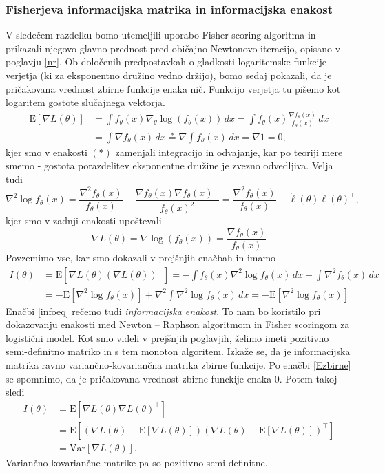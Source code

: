 \documentclass[12pt,a4paper]{amsart}
\theoremstyle{definition} %
\theoremstyle{plain} %
\begin{document}
\subsubsection{Fisherjeva informacijska matrika in informacijska enakost}
V sledečem razdelku bomo utemeljili uporabo Fisher scoring algoritma in prikazali njegovo glavno prednost pred običajno Newtonovo iteracijo, opisano v poglavju \ref{nr}.
Ob določenih predpostavkah o gladkosti logaritemske funkcije verjetja (ki za eksponentno družino vedno držijo), bomo sedaj pokazali, da je pričakovana vrednost
zbirne funkcije enaka nič. Funkcijo verjetja tu pišemo kot logaritem gostote slučajnega vektorja.
\begin{align} \label{Ezbirne}
    \mathrm{E}[\nabla L (\theta)] &= \int f_{\theta}(x) \nabla_{\theta}\log(f_{\theta}(x)) \,dx = \int f_{\theta}(x) \frac{\nabla f_{\theta}(x)}{f_{\theta}(x)} \,dx \nonumber \\
        &= \int \nabla f_{\theta}(x) \,dx \overset{*}{=} \nabla \int f_{\theta}(x) \,dx = \nabla 1 = 0, 
\end{align}
kjer smo v enakosti $(*)$ zamenjali integracijo in odvajanje, kar po teoriji mere smemo - gostota porazdelitev eksponentne družine je zvezno odvedljiva. 
Velja tudi
\[
    \nabla^{2} \log{f_{\theta}(x)} = \frac{\nabla^2 f_{\theta}(x)}{f_{\theta}(x)} - \frac{\nabla f_{\theta}(x) \nabla f_{\theta}(x)^\top }{f_{\theta}(x)^{2}} = 
    \frac{\nabla^2 f_{\theta}(x)}{f_{\theta}(x)} - \dot{\ell}(\theta)\dot{\ell}(\theta)^\top,
\]
kjer smo v zadnji enakosti upoštevali
\[
    \nabla L (\theta) = \nabla \log(f_{\theta}(x)) = \frac{\nabla f_{\theta}(x)}{f_{\theta}(x)} 
\]
Povzemimo vse, kar smo dokazali v prejšnjih enačbah in imamo
\begin{align}\label{infoeq}
    I(\theta) &= \mathrm{E}[\nabla L(\theta)(\nabla L(\theta))^\top] =  -\int f_{\theta}(x) \nabla^2 \log f_{\theta}(x) \,dx+ \int \nabla^2 f_{\theta}(x) \,dx \nonumber \\
    &= -\mathrm{E}[\nabla^2 \log f_{\theta}(x)] + \nabla^2\int \nabla^2 \log f_{\theta}(x) \,dx = -\mathrm{E}[\nabla^2 \log f_{\theta}(x)]
\end{align}
Enačbi \eqref{infoeq} rečemo tudi \textit{informacijska enakost}. To nam bo koristilo pri dokazovanju enakosti med Newton -- Raphson algoritmom in Fisher scoringom za logistični model.
Kot smo videli v prejšnjih poglavjih, želimo imeti pozitivno semi-definitno matriko in s tem monoton algoritem. Izkaže se, da je informacijska matrika ravno variančno-kovariančna matrika
zbirne funkcije. Po enačbi \eqref{Ezbirne} se spomnimo, da je pričakovana vrednost zbirne funckije enaka 0. Potem takoj sledi
\begin{align}
    I(\theta) &= \mathrm{E}[\nabla L(\theta)\nabla L(\theta)^\top] \nonumber\\
    &= \mathrm{E}[\left(\nabla L(\theta) - \mathrm{E}[\nabla L(\theta)]\right)\left(\nabla L(\theta) - \mathrm{E}[\nabla L(\theta)]\right)^\top] \nonumber \\
    &= \mathrm{Var}[\nabla L(\theta)].
\end{align}
Variančno-kovariančne matrike pa so pozitivno semi-definitne.
\end{document}
